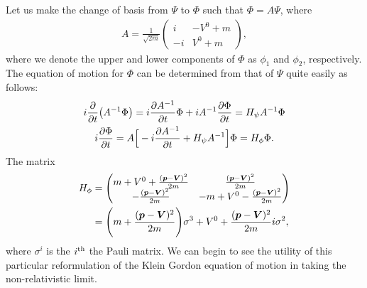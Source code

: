 Let us make the change of basis from $\Psi$ to $\Phi$ such that $\Phi = A \Psi$, where
\begin{align}
    A = \frac{1}{\sqrt{2 m}} 
    \begin{pmatrix}
        i & - V^{0} + m \\
        -i & V^{0} + m
    \end{pmatrix}    
,\end{align}
where we denote the upper and lower components of $\Phi$ as $\phi_{1}$ and $\phi_{2}$, respectively.
The equation of motion for $\Phi$ can be determined from that of $\Psi$ quite easily as follows:
\begin{gather}
    i \pdv{t} ( A^{-1} \Phi ) = i \pdv{A^{-1}}{t} \Phi + i A^{-1} \pdv{\Phi}{t} = H_{\psi} A^{-1} \Phi \\
    i \pdv{\Phi}{t} = A \Big[ - i \pdv{A^{-1}}{t} + H_{\psi} A^{-1} \Big] \Phi = H_{\phi} \Phi
.\end{gather}
The matrix
\begin{align}
    H_{\phi} &= 
    \begin{pmatrix}
        m + V^{0} + \frac{(\vb*{p} - \vb*{V})^2}{2m} & \frac{(\vb*{p} - \vb*{V})^2}{2m} \\
        - \frac{(\vb*{p} - \vb*{V})^2}{2m} & -m + V^{0} - \frac{(\vb*{p} - \vb*{V})^2}{2m}
    \end{pmatrix} 
    \\
    &= \Bigg( m + \frac{(\vb*{p} - \vb*{V})^2}{2m} \Bigg) \sigma^{3} + V^{0} + \frac{(\vb*{p} - \vb*{V})^2}{2m} i \sigma^{2}
,\end{align}
where $\sigma^{i}$ is the $i^{\rm th}$ the Pauli matrix.
We can begin to see the utility of this particular reformulation of the Klein Gordon equation of motion in taking the non-relativistic limit.

